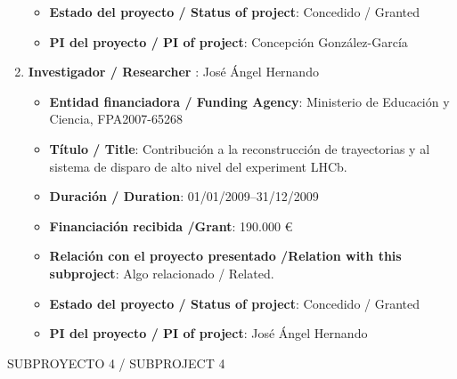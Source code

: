 \begin{enumerate}
\begin{itemize}
\item {\bf Estado del proyecto / Status of project}: Concedido / Granted
\item {\bf PI del proyecto / PI of project}: Concepción González-García 
\end{itemize}
\item {\bf Investigador / Researcher }: José Ángel Hernando
\begin{itemize}
\item {\bf Entidad financiadora / Funding Agency}: Ministerio de Educaci\'on y Ciencia, FPA2007-65268
\item {\bf Título / Title}:  Contribuci\'on a la reconstrucci\'on de trayectorias y al sistema de disparo de alto nivel del experiment LHCb.
\item {\bf Duración / Duration}: 01/01/2009--31/12/2009
\item {\bf Financiación recibida /Grant}: 190.000 \euro 
\item {\bf Relación con el proyecto presentado /Relation with this subproject}: Algo relacionado / Related. 
\item {\bf Estado del proyecto / Status of project}: Concedido / Granted
\item {\bf PI del proyecto / PI of project}: José Ángel Hernando
\end{itemize}
\end{enumerate}


{\sc SUBPROYECTO 4 / SUBPROJECT 4}

